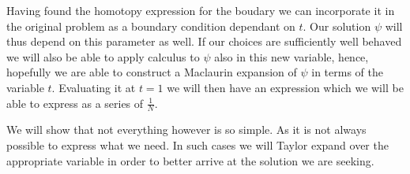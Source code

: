 \documentclass[../main.tex]{subfiles}
\begin{document}
		Having found the homotopy expression for the boudary we can incorporate it in the original problem as a boundary condition dependant on $ t $. Our solution $ \psi $ will thus depend on this parameter as well. If our choices are sufficiently well behaved we will also be able to apply calculus to $ \psi $ also in this new variable, hence, hopefully we are able to construct a Maclaurin expansion of $ \psi $ in terms of the variable $ t $. Evaluating it at $ t=1 $ we will then have an expression which we will be able to express as a series of $ \frac{1}{N} $.
		
		We will show that not everything however is so simple. As it is not always possible to express what we need. In such cases we will Taylor expand over the appropriate variable in order to better arrive at the solution we are seeking.
		
\end{document}
